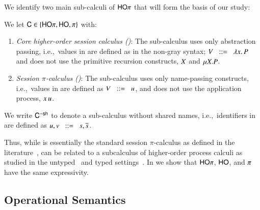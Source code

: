 We identify two main sub-calculi of $\mathsf{HO}\pi$
that will form the basis of our study:
%
\begin{definition}\myrm
	We let $\mathsf{C} \in \{\mathsf{HO}\pi, \mathsf{HO}, \pi\}$ with:
%
	\begin{enumerate}[-]
		\item	{\em Core higher-order session calculus (\HO)}:
			The sub-calculus \HO uses only abstraction passing, i.e.,~values
			in 
			are defined as in the non-gray syntax;
			$V \;\;::=\;\; \lambda x.\,P$ and does not use the primitive
			recursion constructs, $X$ and $\mu X. P$.

		\item	{\em Session $\pi$-calculus (\sessp)}:
			The sub-calculus \sessp uses only name-passing constructs, i.e.,~values
			in 
			are defined as $V \;\;::=\;\; u$, and does not use the application process,
			$x\,u$.
	\end{enumerate}
%
	We write $\mathsf{C}^\mathsf{-sh}$ to denote a sub-calculus without shared names,
	i.e.,~identifiers in  are defined as $u,v \;\;::=\;\; s, \overline{s}$.
\end{definition}
%
Thus, while \sessp is essentially the standard session $\pi$-calculus
as defined in the literature~\cite{honda.vasconcelos.kubo:language-primitives,GH05},
\HO can be related to a subcalculus of higher-order process calculi as studied
in the untyped~\cite{San923,SangiorgiD:picatomp,JeffreyR05}
and typed settings~\cite{tlca07,mostrous09sessionbased,MostrousY15}.
In  we show that 
$\mathsf{HO}\pi$, $\mathsf{HO}$, and $\pi$ have the same expressivity.

\subsection{Operational Semantics}

\label{subsec:reduction_semantics}

